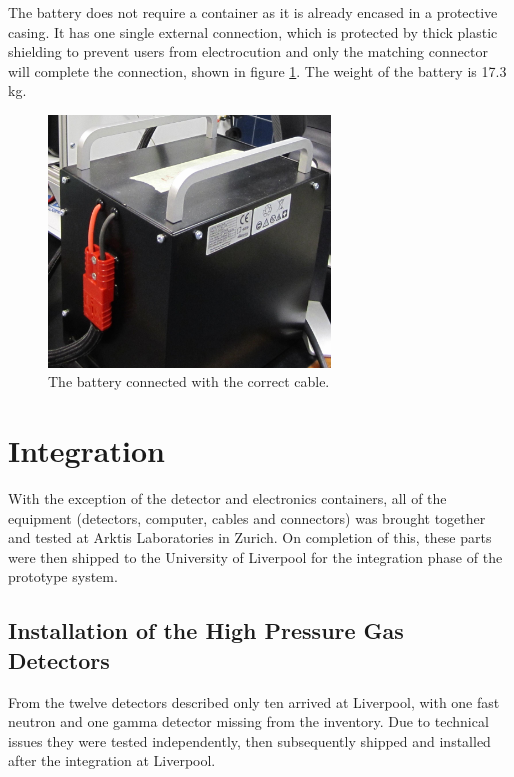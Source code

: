 The battery does not require a container as it is already encased in a protective casing. It has one single external connection, which is protected by thick plastic shielding to prevent users from electrocution and only the matching connector will complete the connection, shown in figure \ref{fig:battery}. The weight of the battery is 17.3 kg. 

\begin{figure}[htbp]
\begin{center}
\includegraphics[width=75mm]{Chapter6/figures/battery.jpg}
\caption{The battery connected with the correct cable.}
\label{fig:battery}
\end{center}
\end{figure}

\section{Integration}
With the exception of the detector and electronics containers, all of the equipment (detectors, computer, cables and connectors) was brought together and tested at Arktis Laboratories in Zurich. On completion of this, these parts were then shipped to the University of Liverpool for the integration phase of the prototype system.  

\subsection{Installation of the High Pressure Gas Detectors}
From the twelve detectors described only ten arrived at Liverpool, with one fast neutron and  one gamma detector missing from the inventory. Due to technical issues they were tested independently, then subsequently shipped and installed after the integration at Liverpool.


